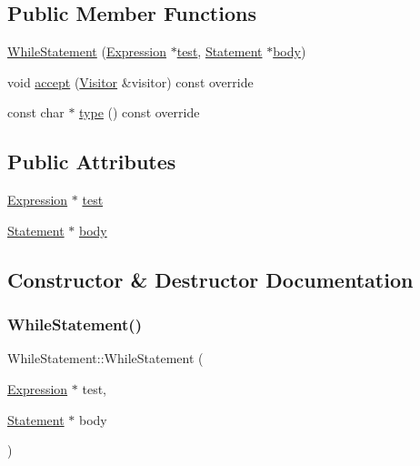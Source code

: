 \subsection*{Public Member Functions}
\begin{DoxyCompactItemize}
\item 
\hyperlink{struct_while_statement_a4dfcc4a8b19b8bdc6492e7f8b8921bcc}{While\+Statement} (\hyperlink{struct_expression}{Expression} $\ast$\hyperlink{struct_while_statement_acfede7e3d617c685032f657a7a95aa15}{test}, \hyperlink{struct_statement}{Statement} $\ast$\hyperlink{struct_while_statement_adcb2abe56520e643ad7b1192099c75e6}{body})
\item 
void \hyperlink{struct_while_statement_a017a8824abdcb5551061dae2a09e8ead}{accept} (\hyperlink{struct_visitor}{Visitor} \&visitor) const override
\item 
const char $\ast$ \hyperlink{struct_while_statement_a4e5965e91f9cca73ffa70ca14d7fd123}{type} () const override
\end{DoxyCompactItemize}
\subsection*{Public Attributes}
\begin{DoxyCompactItemize}
\item 
\hyperlink{struct_expression}{Expression} $\ast$ \hyperlink{struct_while_statement_acfede7e3d617c685032f657a7a95aa15}{test}
\item 
\hyperlink{struct_statement}{Statement} $\ast$ \hyperlink{struct_while_statement_adcb2abe56520e643ad7b1192099c75e6}{body}
\end{DoxyCompactItemize}


\subsection{Constructor \& Destructor Documentation}
\mbox{\label{struct_while_statement_a4dfcc4a8b19b8bdc6492e7f8b8921bcc}} 
\subsubsection{\texorpdfstring{While\+Statement()}{WhileStatement()}}
{\footnotesize\ttfamily While\+Statement\+::\+While\+Statement (\begin{DoxyParamCaption}\item[{\hyperlink{struct_expression}{Expression} $\ast$}]{test,  }\item[{\hyperlink{struct_statement}{Statement} $\ast$}]{body }\end{DoxyParamCaption})\hspace{0.3cm}{\ttfamily [inline]}}



